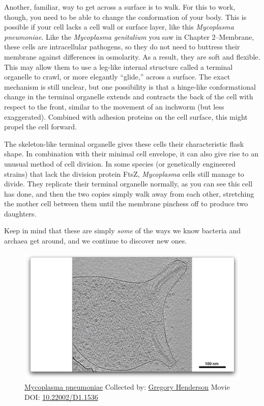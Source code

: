 \documentclass[]{tufte-book}
\begin{document}
Another, familiar, way to get across a surface is to walk. For this to
work, though, you need to be able to change the conformation of your
body. This is possible if your cell lacks a cell wall or surface layer,
like this \emph{Mycoplasma pneumoniae}. Like the \emph{Mycoplasma
genitalium} you saw in Chapter 2--Membrane, these cells are
intracellular pathogens, so they do not need to buttress their membrane
against differences in osmolarity. As a result, they are soft and
flexible. This may allow them to use a leg-like internal structure
called a terminal organelle to crawl, or more elegantly ``glide,''
across a surface. The exact mechanism is still unclear, but one
possibility is that a hinge-like conformational change in the terminal
organelle extends and contracts the back of the cell with respect to the
front, similar to the movement of an inchworm (but less exaggerated).
Combined with adhesion proteins on the cell surface, this might propel
the cell forward.

The skeleton-like terminal organelle gives these cells their
characteristic flask shape. In combination with their minimal cell
envelope, it can also give rise to an unusual method of cell division.
In some species (or genetically engineered strains) that lack the
division protein FtsZ, \emph{Mycoplasma} cells still manage to divide.
They replicate their terminal organelle normally, as you can see this
cell has done, and then the two copies simply walk away from each other,
stretching the mother cell between them until the membrane pinchess off
to produce two daughters.

Keep in mind that these are simply \emph{some} of the ways we know
bacteria and archaea get around, and we continue to discover new ones.





\begin{figure}
\includegraphics{movie_stills/6_12} \caption[\protect\hyperlink{tree}{Mycoplasma pneumoniae} Collected by:
\protect\hyperlink{gregory_henderson}{Gregory Henderson} Movie DOI:
\href{https://doi.org/10.22002/D1.1536}{10.22002/D1.1536}]{\protect\hyperlink{tree}{Mycoplasma pneumoniae} Collected by:
\protect\hyperlink{gregory_henderson}{Gregory Henderson} Movie DOI:
\href{https://doi.org/10.22002/D1.1536}{10.22002/D1.1536}}\label{fig:6-12}
\end{figure}
\end{document}
